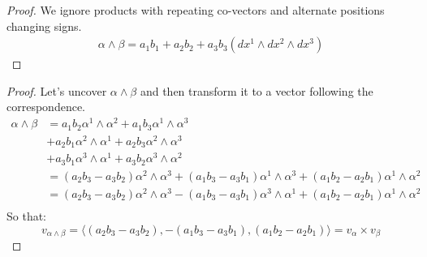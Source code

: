 \begin{problem}
\end{problem}

\begin{proof}
	We ignore products with repeating co-vectors and alternate positions changing signs.
	\begin{align*}
		\alpha \wedge \beta = a_1 b_1 + a_2 b_2 + a_3 b_3 (dx^1 \wedge dx^2 \wedge dx^3 )
	\end{align*}
\end{proof}

\begin{problem}
\end{problem}

\begin{proof}
	Let's uncover $\alpha \wedge \beta$ and then transform it to a vector following the correspondence.
	\begin{align*}
		\alpha \wedge \beta & = a_1b_2 \alpha^1 \wedge \alpha^2 + a_1b_3 \alpha^1 \wedge \alpha^3                                                                    \\
		                    & + a_2b_1 \alpha^2 \wedge \alpha^1 + a_2b_3 \alpha^2 \wedge \alpha^3                                                                    \\
		                    & + a_3b_1 \alpha^3 \wedge \alpha^1 + a_3b_2 \alpha^3 \wedge \alpha^2                                                                    \\
		                    & = (a_2b_3 - a_3b_2) \alpha^2 \wedge \alpha^3  + (a_1b_3 - a_3b_1) \alpha^1 \wedge \alpha^3 + (a_1b_2 - a_2b_1)\alpha^1 \wedge \alpha^2 \\
		                    & = (a_2b_3 - a_3b_2) \alpha^2 \wedge \alpha^3  - (a_1b_3 - a_3b_1) \alpha^3 \wedge \alpha^1 + (a_1b_2 - a_2b_1)\alpha^1 \wedge \alpha^2 \\
	\end{align*}
	So that:
	$$v_{\alpha \wedge \beta} = \langle (a_2b_3 - a_3b_2), - (a_1b_3 - a_3b_1), (a_1b_2 - a_2b_1)\rangle = v_\alpha \times v_\beta$$
\end{proof}

\begin{problem}
\end{problem}

